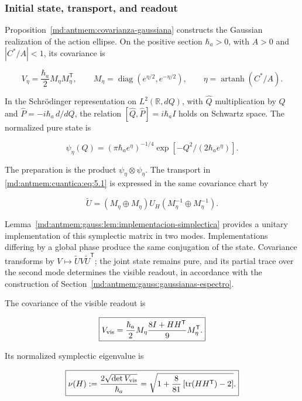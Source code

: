 \subsubsection{Initial state, transport, and readout}

Proposition~\ref{md:antmem:covarianza-gaussiana} constructs the Gaussian realization of the action ellipse. On the positive section \(\hbar_a>0\), with \(A>0\) and \(|C^*/A|<1\), its covariance is

\begin{equation}
V_\eta=\frac{\hbar_a}{2}M_\eta M_\eta^{\mathsf T},\qquad
M_\eta=\operatorname{diag}(e^{\eta/2},e^{-\eta/2}),\qquad
\eta=\operatorname{artanh}(C^*/A).
\label{md:antmem:cuantica:eq:5.4}
\end{equation}

In the Schrödinger representation on \(L^2(\mathbb R,dQ)\), with \(\widehat Q\) multiplication by \(Q\) and \(\widehat P=-i\hbar_a\,d/dQ\), the relation \([\widehat Q,\widehat P]=i\hbar_a I\) holds on Schwartz space. The normalized pure state is

\[
\psi_\eta(Q)=(\pi\hbar_a e^\eta)^{-1/4}
\exp[-Q^2/(2\hbar_a e^\eta)].
\]

The preparation is the product \(\psi_\eta\otimes\psi_\eta\). The transport in \eqref{md:antmem:cuantica:eq:5.1} is expressed in the same covariance chart by

\begin{equation}
\widetilde U=(M_\eta\oplus M_\eta)U_H
(M_\eta^{-1}\oplus M_\eta^{-1}).
\label{md:antmem:cuantica:eq:5.5}
\end{equation}

Lemma~\ref{md:antmem:gauss:lem:implementacion-simplectica} provides a unitary implementation of this symplectic matrix in two modes. Implementations differing by a global phase produce the same conjugation of the state. Covariance transforms by \(V\mapsto\widetilde U V\widetilde U^{\mathsf T}\); the joint state remains pure, and its partial trace over the second mode determines the visible readout, in accordance with the construction of Section~\ref{md:antmem:gauss:gaussianas-espectro}.

\begin{theorem}

The covariance of the visible readout is

\begin{equation}
\boxed{V_{\rm vis}=
\frac{\hbar_a}{2}M_\eta
\frac{8I+HH^{\mathsf T}}9
M_\eta^{\mathsf T}.}
\label{md:antmem:cuantica:eq:5.6}
\end{equation}

Its normalized symplectic eigenvalue is

\begin{equation}
\boxed{\nu(H):=\frac{2\sqrt{\det V_{\rm vis}}}{\hbar_a}
=\sqrt{1+\frac8{81}\left[\operatorname{tr}(HH^{\mathsf T})-2\right]}.}
\label{md:antmem:cuantica:eq:5.7}
\end{equation}
\end{theorem}

